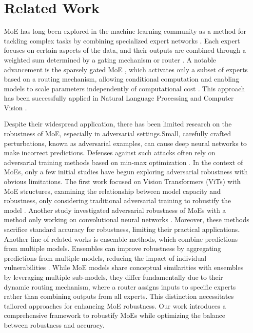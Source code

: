 \section{Related Work}
MoE has long been explored in the machine learning community as a method for tackling complex tasks by combining specialized expert networks \cite{jacobs1991adaptive}. Each expert focuses on certain aspects of the data, and their outputs are combined through a weighted sum determined by a gating mechanism or router \cite{yuksel2012twenty}. A notable advancement is the sparsely gated MoE \cite{shazeer2017outrageously,wang2020deep,riquelme2021scaling,fedus2022switch,xue2022go}, which activates only a subset of experts based on a routing mechanism, allowing conditional computation and enabling models to scale parameters independently of computational cost \cite{patterson2021carbon}. This approach has been successfully applied in Natural Language Processing \cite{du2022glam,lewis2021base} and Computer Vision \cite{riquelme2021scaling,xue2022go}. 

Despite their widespread application, there has been limited research on the robustness of MoE, especially in adversarial settings.Small, carefully crafted perturbations, known as adversarial examples, can cause deep neural networks to make incorrect predictions\cite{goodfellow2014explaining,carlini2017towards,papernot2016limitations}. Defenses against such attacks often rely on adversarial training methods based on min-max optimization \cite{mkadry2017towards,zhang2019theoretically,wang2020fast,Wong2020Fast}. In the context of MoEs, only a few initial studies have begun exploring adversarial robustness with obvious limitations. The first work focused on Vision Transformers (ViTs) with MoE structures, examining the relationship between model capacity and robustness, only considering traditional adversarial training to robustify the model \cite{puigcerver2022adversarial}. Another study investigated adversarial robustness of MoEs with a method only working on convolutional neural networks \cite{zhang2023robust}. Moreover, these methods sacrifice standard accuracy for robustness, limiting their practical applications. Another line of related works is ensemble methods, which combine predictions from multiple models. Ensembles can improve robustness by aggregating predictions from multiple models, reducing the impact of individual vulnerabilities \cite{liu2018towards,alam2022resisting,co2022jacobian,bai2024improving,bai2024mixednuts}. While MoE models share conceptual similarities with ensembles by leveraging multiple sub-models, they differ fundamentally due to their dynamic routing mechanism, where a router assigns inputs to specific experts rather than combining outputs from all experts. This distinction necessitates tailored approaches for enhancing MoE robustness. Our work introduces a comprehensive framework to robustify MoEs while optimizing the balance between robustness and accuracy.